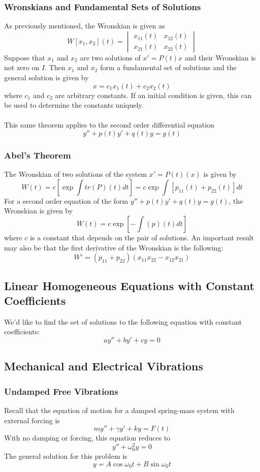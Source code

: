 \documentclass[11pt]{article}
\begin{document}
\subsubsection{Wronskians and Fundamental Sets of Solutions} 
As previously mentioned, the Wronskian is given as 
$$W[x_1, x_2](t) = \begin{vmatrix}
x_{11}(t)&x_{12}(t) \\
x_{21}(t)&x_{22}(t) 
\end{vmatrix}$$
Suppose that $x_1$ and $x_2$ are two solutions of $x'=P(t)x$ and their Wronskian is not zero on $I$. Then $x_1$ and $x_2$ form a fundamental set of solutions and the general solution is given by
$$x = c_1x_1(t) + c_2x_2(t)$$ where $c_1$ and $c_2$ are arbitrary constants. If an initial condition is given, this can be used to determine the constants uniquely.
\\ \\
This same theorem applies to the second order differential equation $$y'' + p(t)y' +q(t)y = g(t)$$
\subsubsection{Abel's Theorem}
The Wronskian of two solutions of the system $x' = P(t)(x)$ is given by
$$W(t) = c \left[ \exp \int tr (P)(t) dt\right] = c \exp \int [p_{11}(t) + p_{22}(t)]dt$$ For a second order equation of the form $y'' + p(t)y' +q(t)y = g(t)$, the Wronskian is given by  
$$W(t) = c  \exp\left[ - \int(p)(t) dt\right]
$$ where $c$ is a constant that depends on the pair of solutions. An important result may also be that the first derivative of the Wronskian is the following:
$$ W' = (p_{11} + p_{22})(x_{11}x_{22} - x_{12}x_{21})$$


\subsection{Linear Homogeneous Equations with Constant Coefficients}
We'd like to find the set of solutions to the following equation with constant coefficients:
$$ay'' + by'+cy =0$$
\subsection{Mechanical and Electrical Vibrations}
\subsubsection{Undamped Free Vibrations}
Recall that the equation of motion for a damped spring-mass system with external forcing is $$my'' +\gamma y' + ky = F(t)$$
With no damping or forcing, this equation reduces to $$y'' + \omega_0^2 y = 0$$ The general solution for this problem is $$ y = A\cos \omega_0 t + B \sin \omega_0 t $$
\end{document}
